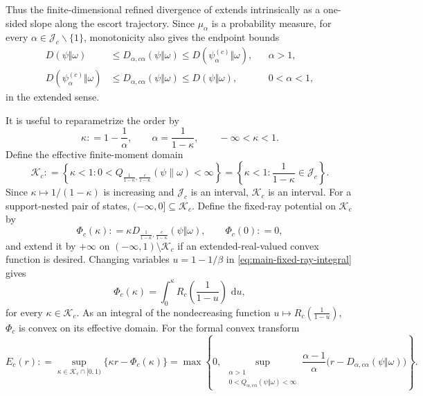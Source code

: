 \documentclass[12pt]{article}
\numberwithin{equation}{section}
\theoremstyle{definition}
\theoremstyle{remark}
\newcommand{\dd}{\,\mathrm d}
\newcommand{\?}{\overset{?}{=}}
\newcommand{\defeq}{\mathrel{\mathop:}=}
\begin{document}
Thus the finite-dimensional refined divergence of \cite{Bao:2019aol} extends intrinsically as a
one-sided slope along the escort trajectory.  Since $\mu_\alpha$ is a probability measure, for every $\alpha\in \mathcal J_c\backslash\{1\} $, monotonicity
also gives the endpoint bounds
\begin{align}
  D(\psi\Vert\omega)
  &\leq D_{\alpha,c\alpha}(\psi\Vert\omega)
  \leq D(\psi_\alpha^{(c)}\Vert\omega),
  &&\alpha>1,
  \label{eq:upper-endpoint-bounds}\\
  D(\psi_\alpha^{(c)}\Vert\omega)
  &\leq D_{\alpha,c\alpha}(\psi\Vert\omega)
  \leq D(\psi\Vert\omega),
  &&0<\alpha<1,
  \label{eq:lower-endpoint-bounds}
\end{align}
in the extended sense.

It is useful to reparametrize the order by
\begin{equation}
  \kappa\defeq 1-\frac1\alpha,
  \qquad
  \alpha=\frac1{1-\kappa},
  \qquad -\infty<\kappa<1.
  \label{eq:kappa-parameter}
\end{equation}
Define the effective finite-moment domain
\begin{equation}
  \mathcal K_c
  \defeq \left\{\kappa<1:
  0<Q_{\frac1{1-\kappa},\frac{c}{1-\kappa}}
       (\psi\|\omega)<\infty\right\}
  =\left\{\kappa<1:\frac1{1-\kappa}\in\mathcal J_c\right\}.
  \label{eq:ray-effective-domain}
\end{equation}
Since $\kappa\mapsto1/(1-\kappa)$ is increasing and $\mathcal J_c$ is an
interval, $\mathcal K_c$ is an interval.  For a support-nested pair of states,
$(-\infty,0]\subseteq\mathcal K_c$.
Define the fixed-ray potential on
$\mathcal K_c$ by
\begin{equation}
  \Phi_c(\kappa)
  \defeq \kappa
  D_{\frac1{1-\kappa},\frac{c}{1-\kappa}}
       (\psi\Vert\omega),
  \qquad \Phi_c(0)\defeq 0,
  \label{eq:ray-potential}
\end{equation}
and extend it by $+\infty$ on $(-\infty,1)\setminus\mathcal K_c$ if an
extended-real-valued convex function is desired.
Changing variables $u=1-1/\beta$ in
\eqref{eq:main-fixed-ray-integral} gives
\begin{equation}
  \Phi_c(\kappa)
  =\int_0^\kappa
   R_c\!\left(\frac1{1-u}\right)\,\dd u,
  \label{eq:ray-potential-integral}
\end{equation}
for every $\kappa\in\mathcal K_c$.  As an integral of the nondecreasing function $u\mapsto R_c\left(\frac1{1-u} \right)$, $\Phi_c$ is convex on
its effective domain.  For the formal convex transform
\begin{equation}
  E_c(r)
  \defeq 
  \sup_{\kappa\in\mathcal K_c\cap[0,1)} \{\kappa r-\Phi_c(\kappa)\}
  =
  \max\!\left\{
    0,\,
    \sup_{\substack{\alpha>1\\
    0<Q_{\alpha,c\alpha}(\psi\Vert\omega)<\infty}}
    \frac{\alpha-1}{\alpha}
    \bigl(r-D_{\alpha,c\alpha}(\psi\Vert\omega)\bigr)
  \right\}.
  \label{eq:formal-convex-transform}
\end{equation}
\end{document}
